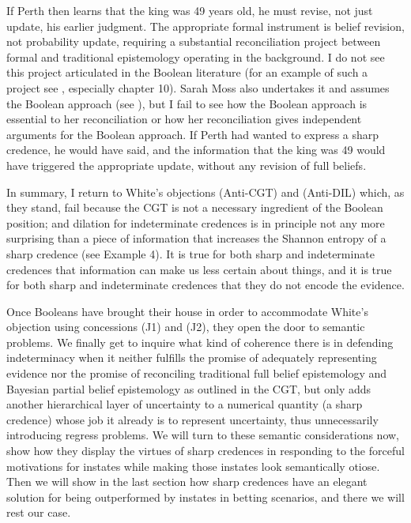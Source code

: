 \documentclass[11pt]{article}
\begin{document}
If Perth then learns that the king was 49 years old, he must revise,
not just update, his earlier judgment. The appropriate formal
instrument is belief revision, not probability update, requiring a
substantial reconciliation project between formal and traditional
epistemology operating in the background. I do not see this project
articulated in the Boolean literature (for an example of such a
project see , especially chapter 10). Sarah Moss
also undertakes it and assumes the Boolean approach (see
), but I fail to see how the Boolean approach is
essential to her reconciliation or how her reconciliation gives
independent arguments for the Boolean approach. If Perth had wanted to
express a sharp credence, he would have said,  and the information that the king
was 49 would have triggered the appropriate update, without any
revision of full beliefs.

In summary, I return to White's objections (Anti-CGT) and (Anti-DIL)
which, as they stand, fail because the CGT is not a necessary
ingredient of the Boolean position; and dilation for indeterminate
credences is in principle not any more surprising than a piece of
information that increases the Shannon entropy of a sharp credence
(see Example 4). It is true for both sharp and indeterminate credences
that information can make us less certain about things, and it is true
for both sharp and indeterminate credences that they do not encode the
evidence. 

Once Booleans have brought their house in order to accommodate White's
objection using concessions (J1) and (J2), they open the door to
semantic problems. We finally get to inquire what kind of coherence
there is in defending indeterminacy when it neither fulfills the
promise of adequately representing evidence nor the promise of
reconciling traditional full belief  epistemology and
Bayesian partial belief epistemology as outlined in the CGT, but only
adds another hierarchical layer of uncertainty to a numerical quantity
(a sharp credence) whose job it already is to represent uncertainty,
thus unnecessarily introducing regress problems. We will turn to these
semantic considerations now, show how they display the virtues of
sharp credences in responding to the forceful motivations for instates
while making those instates look semantically otiose. Then we will
show in the last section how sharp credences have an elegant solution
for being outperformed by instates in betting scenarios, and there we
will rest our case.
\end{document}
